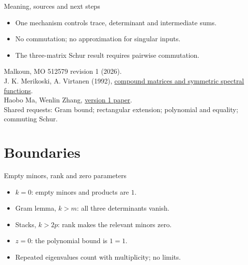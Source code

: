 \documentclass{beamer}
\begin{document}
\begin{frame}{Meaning, sources and next steps}
\begin{itemize}
\item One mechanism controls trace, determinant and intermediate sums.
\item No commutation; no approximation for singular inputs.
\item The three-matrix Schur result requires pairwise commutation.
\end{itemize}
\small
Malkoun, MO 512579 revision 1 (2026).\\
J. K. Merikoski, A. Virtanen (1992),
\href{https://doi.org/10.21136/cmj.1992.128332}{compound matrices and symmetric spectral functions}.\\
Haobo Ma, Wenlin Zhang,
\href{https://doi.org/10.5281/zenodo.23920583}{version 1 paper}.\\
Shared requests: Gram bound; rectangular extension; polynomial and equality; commuting Schur.
\end{frame}
\appendix
\section{Boundaries}
\begin{frame}{Empty minors, rank and zero parameters}
\begin{itemize}
\item $k=0$: empty minors and products are $1$.
\item Gram lemma, $k>m$: all three determinants vanish.
\item Stacks, $k>2p$: rank makes the relevant minors zero.
\item $z=0$: the polynomial bound is $1=1$.
\item Repeated eigenvalues count with multiplicity; no limits.
\end{itemize}
\end{frame}
\end{document}
